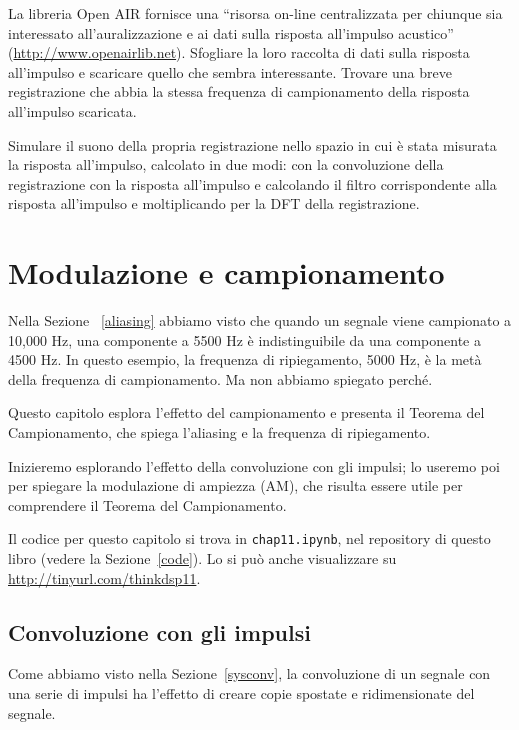 \documentclass[12pt]{book} \usepackage[width=5.5in,height=8.5in, hmarginratio=3:2,vmarginratio=1:1]{geometry}
\begin{document}
\begin{exercise} La libreria Open AIR fornisce una ``risorsa on-line centralizzata per chiunque sia interessato all'auralizzazione e ai dati sulla risposta all'impulso acustico'' (\url{http://www.openairlib.net}). Sfogliare la loro raccolta di dati sulla risposta all'impulso e scaricare quello che sembra interessante. Trovare una breve registrazione che abbia la stessa frequenza di campionamento della risposta all'impulso scaricata.

Simulare il suono della propria registrazione nello spazio in cui è stata misurata la risposta all'impulso, calcolato in due modi: con la convoluzione della registrazione con la risposta all'impulso e calcolando il filtro corrispondente alla risposta all'impulso e moltiplicando per la DFT della registrazione. \end{exercise} 

\chapter{Modulazione e campionamento} 

Nella Sezione ~\ref{aliasing} abbiamo visto che quando un segnale viene campionato a 10,000 Hz, una componente a 5500 Hz è indistinguibile da una componente a 4500 Hz. In questo esempio, la frequenza di ripiegamento, 5000 Hz, è la metà della frequenza di campionamento. Ma non abbiamo spiegato perché.

Questo capitolo esplora l'effetto del campionamento e presenta il Teorema del Campionamento, che spiega l'aliasing e la frequenza di ripiegamento.

Inizieremo esplorando l'effetto della convoluzione con gli impulsi; lo useremo poi per spiegare la modulazione di ampiezza (AM), che risulta essere utile per comprendere il Teorema del Campionamento.

Il codice per questo capitolo si trova in {\tt chap11.ipynb}, nel repository di questo libro (vedere la Sezione~\ref{code}). Lo si può anche visualizzare su \url{http://tinyurl.com/thinkdsp11}.

\section{Convoluzione con gli impulsi} 

Come abbiamo visto nella Sezione~\ref{sysconv}, la convoluzione di un segnale con una serie di impulsi ha l'effetto di creare copie spostate e ridimensionate del segnale.
\end{document}
